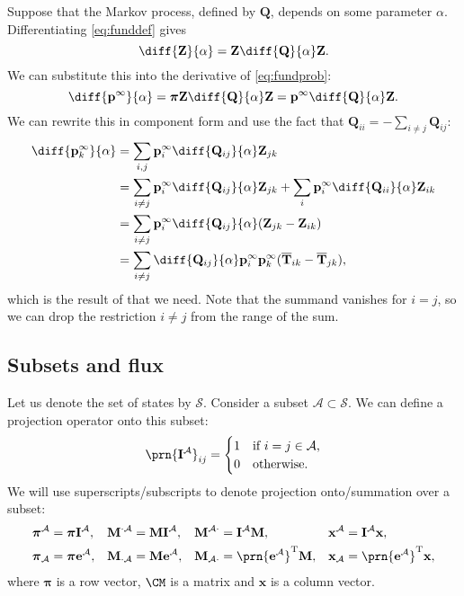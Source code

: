 \documentclass[12pt]{article}
\newcommand{\trans}{^\mathrm{T}}
\newcommand{\I}{\mathbf{I}}
\newcommand{\onev}{\mathbf{e}}
\newcommand{\MM}{\mathbf{Q}}
\newcommand{\eq}{\mathbf{p}^\infty}
\newcommand{\fpt}{\mathbf{T}}
\newcommand{\fptb}{\overline{\fpt}}
\newcommand{\fund}{\mathbf{Z}}
\newcommand{\pib}{\boldsymbol{\pi}}
\newcommand{\M}{\mathbf{M}}
\newcommand{\CS}{\mathcal{S}}
\newcommand{\CA}{\mathcal{A}}
\begin{document}
Suppose that the Markov process, defined by $\MM$, depends on some parameter $\alpha$.
Differentiating \eqref{eq:funddef} gives
%
\begin{equation}\label{eq:diffZ}
  \diff{\fund}{\alpha} = \fund \diff{\MM}{\alpha} \fund.
\end{equation}
%
We can substitute this into the derivative of \eqref{eq:fundprob}:
%
\begin{equation}\label{eq:diffp}
  \diff{\eq}{\alpha} = \pib \fund \diff{\MM}{\alpha} \fund = \eq \diff{\MM}{\alpha} \fund.
\end{equation}
%
We can rewrite this in component form and use the fact that $\MM_{ii} = - \sum_{i\neq j} \MM_{ij}$:
%
\begin{equation}\label{eq:diffpT}
\begin{aligned}
  \diff{\eq_k}{\alpha} &= \sum_{i,j} \eq_i \diff{\MM_{ij}}{\alpha} \fund_{jk} \\
    &= \sum_{i\neq j} \eq_i \diff{\MM_{ij}}{\alpha} \fund_{jk} + \sum_i \eq_i \diff{\MM_{ii}}{\alpha} \fund_{ik} \\
    &= \sum_{i\neq j} \eq_i \diff{\MM_{ij}}{\alpha} (\fund_{jk} - \fund_{ik}) \\
    &= \sum_{i\neq j} \diff{\MM_{ij}}{\alpha} \eq_i \eq_k (\fptb_{ik} - \fptb_{jk}),
\end{aligned}
\end{equation}
%
which is the result of \cite{cho2000markov} that we need.
Note that the summand vanishes for $i=j$, so we can drop the restriction $i\neq j$ from the range of the sum.

\subsection{Subsets and flux}\label{sec:subsets}

Let us denote the set of states by $\CS$.
Consider a subset $\CA\subset\CS$.
We can define a projection operator onto this subset:
%
\begin{equation}\label{eq:proj}
  \prn{\I^\CA}_{ij} =
    \begin{cases}
      1 &\text{if $i=j\in\CA$,}\\
      0 &\text{otherwise.}
    \end{cases}
\end{equation}
%
We will use superscripts/subscripts to denote projection onto/summation over a subset:
%
\begin{equation}\label{eq:projsum}
  \begin{aligned}
    \pib^\CA &=\pib\I^\CA, &
    \M^{\cdot\CA}&=\M\I^\CA, &
    \M^{\CA\cdot}&=\I^\CA\M, &
    \mathbf{x}^\CA &= \I^\CA\mathbf{x},
    \\
    \pib_\CA &=\pib\onev^\CA, &
    \M_{\cdot\CA}&=\M\onev^\CA, &
    \M_{\CA\cdot}&=\prn{\onev^\CA}\trans\M, &
    \mathbf{x}_\CA &= \prn{\onev^\CA}\trans\mathbf{x},
  \end{aligned}
\end{equation}
%
where $\pib$ is a row vector, $\CM$ is a matrix and $\mathbf{x}$ is a column vector.
\end{document}
